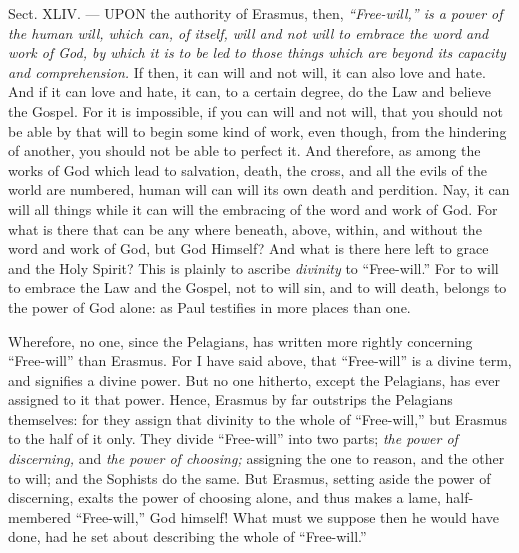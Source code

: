 
Sect. XLIV. — UPON the authority of Erasmus, then, \emph{“Free-will,” is a power of the human will, which can, of itself, will and not will to embrace the word and work of God, by which it is to be led to those things which are beyond its capacity and comprehension. }If then, it can will and not will, it can also love and hate. And if it can love and hate, it can, to a certain degree, do the Law and believe the Gospel. For it is impossible, if you can will and not will, that you should not be able by that will to begin some kind of work, even though, from the hindering of another, you should not be able to perfect it. And therefore, as among the works of God which lead to salvation, death, the cross, and all the evils of the world are numbered, human will can will its own death and perdition. Nay, it can will all things while it can will the embracing of the word and work of God. For what is there that can be any where beneath, above, within, and without the word and work of God, but God Himself? And what is there here left to grace and the Holy Spirit? This is plainly to ascribe \emph{divinity }to “Free-will.” For to will to embrace the Law and the Gospel, not to will sin, and to will death, belongs to the power of God alone: as Paul testifies in more places than one.

Wherefore, no one, since the Pelagians, has written more rightly concerning “Free-will” than Erasmus. For I have said above, that “Free-will” is a divine term, and signifies a divine power. But no one hitherto, except the Pelagians, has ever assigned to it that power. Hence, Erasmus by far outstrips the Pelagians themselves: for they assign that divinity to the whole of “Free-will,” but Erasmus to the half of it only. They divide “Free-will” into two parts; \emph{the power of discerning, }and \emph{the power of choosing; }assigning the one to reason, and the other to will; and the Sophists do the same. But Erasmus, setting aside the power of discerning, exalts the power of choosing alone, and thus makes a lame, half-membered “Free-will,” God himself! What must we suppose then he would have done, had he set about describing the whole of “Free-will.”

